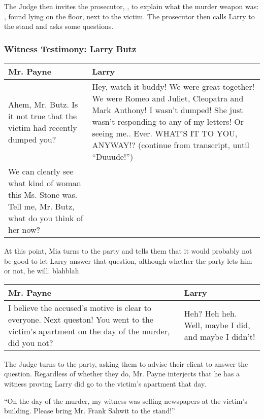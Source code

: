 The Judge then invites the prosecutor, , to explain what the murder weapon was: , found lying on the floor, next to the victim. The prosecutor then calls Larry to the stand and asks some questions.

\subsubsection{Witness Testimony: Larry Butz}
\begin{center}
\begin{tabular}{p{2.5in} p{2.5in}}
Mr. Payne & Larry \\\hline
Ahem, Mr. Butz. Is it not true that the victim had recently dumped you? & Hey, watch it buddy! We were great together! We were Romeo and Juliet, Cleopatra and Mark Anthony! I wasn't dumped! She just wasn't responding to any of my letters! Or seeing me.. Ever. WHAT'S IT TO YOU, ANYWAY!? (continue from transcript, until ``Duuude!'')\\
We can clearly see what kind of woman this Ms. Stone was. Tell me, Mr. Butz, what do you think of her now? \\
\end{tabular}
\end{center}

At this point, Mia turns to the party and tells them that it would probably not be good to let Larry answer that question, although whether the party lets him or not, he will.
blahblah


\begin{center}
\begin{tabular}{p{2.5in} p{2.5in}}
Mr. Payne & Larry \\\hline
I believe the accused's motive is clear to everyone. Next queston! You went to the victim's apartment on the day of the murder, did you not? & Heh? Heh heh. Well, maybe I did, and maybe I didn't!
\end{tabular}
\end{center}

The Judge turns to the party, asking them to advise their client to answer the question. Regardless of whether they do, Mr. Payne interjects that he has a witness proving Larry did go to the victim's apartment that day. 

\begin{center}
``On the day of the murder, my witness was selling newspapers at the victim's building. Please bring Mr. Frank Sahwit to the stand!''
\end{center}

